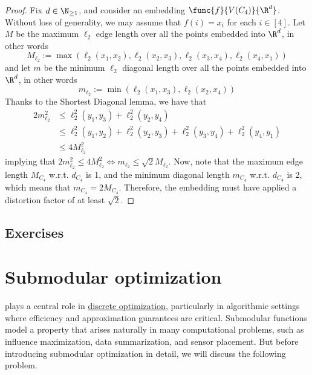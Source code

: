 \documentclass[a4paper, 12pt]{report}
\begin{document}
    \begin{proof}
        Fix $d \in \N_{\ge 1}$, and consider an embedding $\func{f}{V(C_4)}{\R^d}$. Without loss of generality, we may assume that $f(i) = x_i$ for each $i \in [4]$. Let $M$ be the maximum $\ell_2$ edge length over all the points embedded into $\R^d$, in other words $$M_{\ell_2} := \max(\ell_2(x_1, x_2), \ell_2(x_2, x_3), \ell_2(x_3, x_4), \ell_2(x_4, x_1))$$ and let $m$ be the minimum $\ell_2$ diagonal length over all the points embedded into $\R^d$, in other words $$m_{\ell_2} := \min(\ell_2(x_1, x_3), \ell_2(x_2, x_4))$$ Thanks to the Shortest Diagonal lemma, we have that
        \begin{equation*}
            \begin{split}
                2m_{\ell_2}^2 &\le \ell_2^2(y_1, y_3) + \ell_2^2(y_2, y_4) \\
                     &\le \ell_2^2(y_1, y_2) + \ell_2^2(y_2, y_3) + \ell_2^2(y_3, y_4) + \ell_2^2(y_4, y_1) \\
                     &\le 4M_{\ell_2}^2
            \end{split}
        \end{equation*}
        implying that $2m_{\ell_2}^2 \le 4M_{\ell_2}^2 \iff m_{\ell_2} \le \sqrt 2 M_{\ell_2}$. Now, note that the maximum edge length $M_{C_4}$ w.r.t. $d_{C_4}$ is 1, and the minimum diagonal length $m_{C_4}$ w.r.t. $d_{C_4}$ is 2, which means that $m_{C_4} = 2 M_{C_4}$. Therefore, the embedding must have applied a distortion factor of at least $\sqrt 2$.
    \end{proof}

    \section{Exercises}
    
    \chapter{Submodular optimization}

     plays a central role in \href{https://en.wikipedia.org/wiki/Discrete_optimization}{discrete optimization}, particularly in algorithmic settings where efficiency and approximation guarantees are critical. Submodular functions model a  property that arises naturally in many computational problems, such as influence maximization, data summarization, and sensor placement. But before introducing submodular optimization in detail, we will discuss the following problem.
\end{document}

